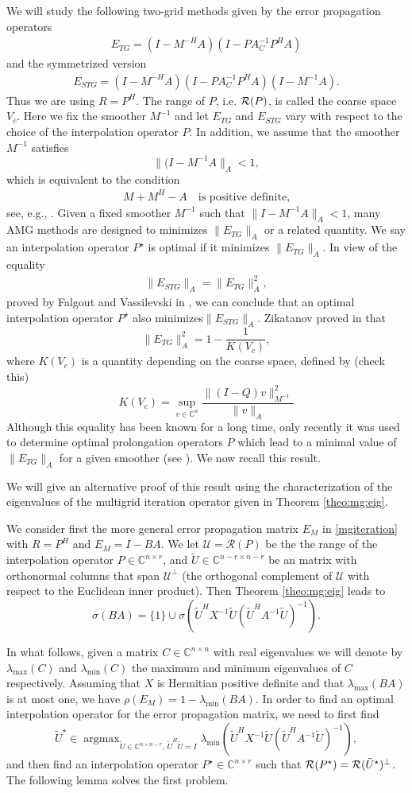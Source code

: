 \documentclass[final]{siamltex}
\newcommand{\innbCnnmr}{\in\mathbb{C}^{n\times n-r}}
\DeclareMathOperator*{\argmax}{argmax}
\newcommand{\U}{\mathcal{U}}
\newcommand{\beq}{\begin{eqnarray}}
\newcommand{\eeq}{\end{eqnarray}}
\numberwithin{equation}{section}
\newcommand{\im} {{\cal R}}
\newcommand{\ran} {{\cal R}}
\newcommand{\Cn}{\mathbb{C}^n}
\newcommand{\Cnr}{\mathbb{C}^{n \times r}}
\newcommand{\Cnmr}{\mathbb{C}^{n-r \times n-r}}
\newcommand{\inCnn}{\in \mathbb{C}^{n \times n}}
\begin{document}
We will study the  following two-grid  methods given by the error
propagation
operators
\beq \label{mge}
E_{TG} = (I-M^{-H}A)(I -  PA_C^{-1}P^HA)
\eeq
 and the symmetrized version
\beq \label{smge}
E_{STG} = (I-M^{-H}A)(I -  PA_C^{-1}P^HA)(I-M^{-1}A).
\eeq
Thus we are using $R = P^H$. The range of $P$,
i.e.
$\ran
(P)$,
is
called
the
coarse space $V_c$.
Here   we fix  the smoother $M^{-1}$ and let $E_{TG}$ and $E_{STG}$ vary with
respect  to the choice of the interpolation operator $P$. In addition, we
assume that the smoother
$M^{-1}$
satisfies 
\[
 \|(I-M^{-1}A \|_A < 1,
\]
which is equivalent to the condition
\beq \label{eq:pos}
M +  M^{H} - A  \quad \mbox{is  positive definite,} 
\eeq
see, e.g., \cite{Vas08}. Given a fixed  smoother $M^{-1}$ such that $\|
I-M^{-1}A\|_A < 1$, many AMG
methods are designed to minimizes $ \|E_{TG}\|_A$ or a related quantity. We
say an interpolation operator $P^\star$ is optimal
if it minimizes  $ \|E_{TG}\|_A$. In
view of the equality
\beq \label{normeq}
\|E_{STG}\|_A = \|E_{TG}\|_A^2,
\eeq
proved by 
Falgout
and Vassilevski in
\cite{FalV04}, we can conclude that an optimal interpolation operator
$P^\star$  
also minimizes$ \|E_{STG}\|_A$. Zikatanov
proved in \cite[Lemma 2.3]{Zik08} that
\[
 \|E_{TG}\|_A^2 = 1 - \frac{1}{K(V_c)},
\]
where  $ K(V_c)$ is  a  quantity  depending  on the  coarse space, defined by
(check this)
\[ K(V_c) = \sup_{v \in \Cn} \frac{\|(I-Q)v\|_{M^{-1}}^2}{\|v\|_A} \]
Although  this 
equality has been known for a long time, only  recently it was used to
determine
optimal prolongation operators $P$  which lead   to a minimal  value of
$\|E_{TG}\|_A$ for a given smoother (see \cite{XuZ17, Bra18}). We now recall
this result.

We will give an  alternative proof of this result using the
characterization
of
the
eigenvalues of the multigrid iteration operator  given in Theorem
\ref{theo:mg:eig}.  

We  consider first  the  more general error propagation matrix $E_M$ in
\eqref{mgiteration} with $R= P^H$  and  $E_{M} = I - BA$. We let $\U=
\mathcal{R}(P) $ be the
the
range of the interpolation operator
$P \in \Cnr$, and $\tilde U \in \Cnmr $ be an matrix with orthonormal columns
that span
$\U
^\perp$ (the
orthogonal complement  of $\U$ with respect to the Euclidean inner product).
Then
Theorem \ref{theo:mg:eig}  leads to
\[
\sigma (BA) = \{1\} \cup \sigma(\tilde U^HX^{-1}\tilde U (\tilde
U^HA^{-1}\tilde U)^{-1}).
\]

In what follows, given a matrix $C \inCnn$ with real eigenvalues we will denote
by
$\lambda_{\max}(C)$ and
$\lambda_{\min}(C)$
the maximum and minimum eigenvalues of $C$ respectively. Assuming that $X$ is
Hermitian positive definite and that
$\lambda_{\max}(BA)$ is at most one, we have
$\rho(E_M) = 1 - \lambda_{\min}(BA)$. In order to find an optimal interpolation
operator for the error propagation matrix,  we need  to first find
\[  \tilde{U}^\star \in \argmax_{\tilde U \innbCnnmr,\, \tilde
U^H\tilde U = I}
\lambda_{\min}(\tilde
U^HX^{-1}\tilde
U
(\tilde
U^HA^{-1}\tilde U)^{-1}),
\]
and then find an interpolation operator $P^\star \in \Cnr$ such that
$\im(P^\star) =\im(\tilde U^\star)^{\perp}$. The following lemma  solves the 
first problem.
\end{document}
